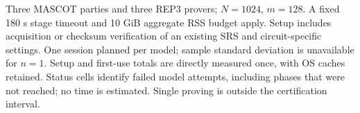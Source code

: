 \begin{table}[t]
\centering
\caption{System-level end-to-end efficiency of BlindCert.}
\label{tab:baseline-performance}
\scriptsize
\setlength{\tabcolsep}{3pt}
\par\smallskip
\parbox{\linewidth}{\scriptsize Three MASCOT parties and three REP3 provers; $N=1024$, $m=128$. A fixed 180 s stage timeout and 10 GiB aggregate RSS budget apply. Setup includes acquisition or checksum verification of an existing SRS and circuit-specific settings. One session planned per model; sample standard deviation is unavailable for $n=1$. Setup and first-use totals are directly measured once, with OS caches retained. Status cells identify failed model attempts, including phases that were not reached; no time is estimated. Single proving is outside the certification interval.}
\end{table}
